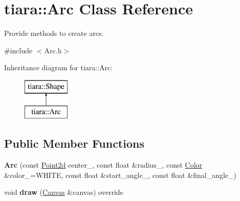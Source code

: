 \hypertarget{classtiara_1_1Arc}{}\section{tiara\+::Arc Class Reference}
\label{classtiara_1_1Arc}


Provide methods to create arcs.  




{\ttfamily \#include $<$Arc.\+h$>$}

Inheritance diagram for tiara\+::Arc\+:\begin{figure}[H]
\begin{center}
\leavevmode
\includegraphics[height=2.000000cm]{classtiara_1_1Arc}
\end{center}
\end{figure}
\subsection*{Public Member Functions}
\begin{DoxyCompactItemize}
\item 
\mbox{\label{classtiara_1_1Arc_a97ead278269f394565ee7a63805e296d}} 
{\bfseries Arc} (const \mbox{\hyperlink{classtiara_1_1Point2d}{Point2d}} center\+\_\+, const float \&radius\+\_\+, const \mbox{\hyperlink{classtiara_1_1Color}{Color}} \&color\+\_\+=W\+H\+I\+TE, const float \&start\+\_\+angle\+\_, const float \&final\+\_\+angle\+\_)
\item 
\mbox{\label{classtiara_1_1Arc_a09f4212960d4d14c27ecae14344b8d6f}} 
void {\bfseries draw} (\mbox{\hyperlink{classtiara_1_1Canvas}{Canvas}} \&canvas) override
\end{DoxyCompactItemize}
